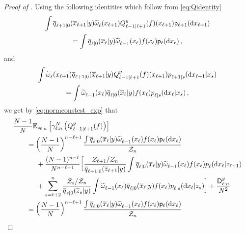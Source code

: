 \begin{proof}[Proof of ]
    Using the following identities which follow from \eqref{eq:Qidentity}
    \begin{multline*}
        \int  \tfwtrans{\ell+1|0}{\lmeas}{\ltopstate_{\ell+1}} \uweight{}{\ell}(x_{\ell+1}) \Qker{\ell-1|\ell+1}{y}(f)(x_{\ell+1}) \bwmarg{\ell+1}{\rmd x_{\ell+1}}\\
        = \int  \tfwtrans{\ell|0}{\lmeas}{\ltopstate_\ell} \uweight{}{\ell-1}(x_\ell) f(x_\ell) \bwmarg{\ell}{\rmd x_\ell}\eqsp,
    \end{multline*}
    and 
    \begin{multline*} 
        \int \uweight{}{\ell}(x_{\ell+1}) \tfwtrans{\ell+1|0}{\lmeas}{\ltopstate_{\ell+1}} \Qker{\ell-1|\ell+1}{y}(f)(x_{\ell+1}) \bwtrans{}{\ell+1|s}{x_s}{\rmd x_{\ell+1}} \\
         = \int \uweight{}{\ell-1}(x_\ell)  \tfwtrans{\ell|0}{\lmeas}{\ltopstate_\ell} f(x_\ell) \bwtrans{}{\ell|s}{x_s}{\rmd x_\ell}\eqsp,
    \end{multline*}
    we get by \eqref{eq:normconstest_exp} that  
    \begin{equation}
        \begin{aligned} 
         & \frac{N-1}{N} \pE_{z_{0:n}} \left[ \normconstest{\ell:n}\left( \Qker{\ell-1|\ell+1}{y}(f)\right)\right]  \\
         & \hspace{.7cm} = \left( \frac{N-1}{N} \right)^{n-\ell + 1} \frac{\int \tfwtrans{\ell|0}{\lmeas}{\ltopstate_\ell} \uweight{}{\ell-1}(x_\ell) f(x_\ell) \bwmarg{\ell}{\rmd x_\ell}}{\normconst_n} \\
        & \hspace{1.2cm} + \frac{(N-1)^{n-\ell}}{N^{n-\ell+1}} \bigg[ \frac{\normconst_{\ell+1} / \normconst_{n}}{\tfwtrans{\ell+1|0}{\lmeas}{\overline{z}_{\ell+1}}} \int  \tfwtrans{\ell|0}{\lmeas}{\ltopstate_\ell} \uweight{}{\ell-1}(x_\ell) f(x_\ell) \bwtrans{}{\ell}{z_{\ell+1}}{\rmd x_\ell}\\
        & \hspace{1.2cm} + \sum_{s=\ell+2} ^n \frac{\normconst_s / \normconst_n}{\tfwtrans{s|0}{\lmeas}{\overline{z}_s}} \int \uweight{}{\ell-1}(x_\ell)  \tfwtrans{\ell|0}{\lmeas}{\ltopstate_\ell} f(x_\ell) \bwtrans{}{\ell|s}{z_s}{\rmd x_\ell} \bigg] + \frac{\mathsf{D}^\lmeas _{\ell:n}}{N^2}\\
        & \hspace{.7cm} = \left( \frac{N-1}{N} \right)^{n-\ell + 1} \frac{\int  \tfwtrans{\ell|0}{\lmeas}{\ltopstate_\ell} \uweight{}{\ell-1}(x_\ell) f(x_\ell) \bwmarg{\ell}{\rmd x_\ell}}{\normconst_n} \\

\end{aligned}
\end{equation}
\end{proof}

